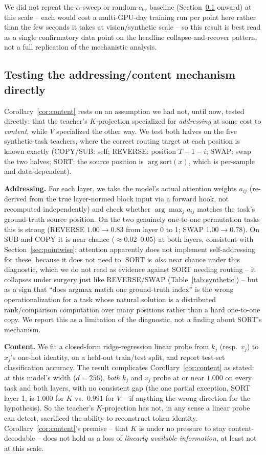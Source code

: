 \documentclass[11pt]{article}
\begin{document}
We did not repeat the $\alpha$-sweep or random-$c_{kv}$ baseline
(Section~\ref{sec:mechanism} onward) at this scale -- each would cost a multi-GPU-day
training run per point here rather than the few seconds it takes at vision/synthetic
scale -- so this result is best read as a
single confirmatory data point on the headline collapse-and-recover pattern, not a
full replication of the mechanistic analysis.

\subsection{Testing the addressing/content mechanism directly}
\label{sec:mechanism}

Corollary~\ref{cor:content} rests on an assumption we had not, until now, tested
directly: that the teacher's $K$-projection specialized for \emph{addressing} at some
cost to \emph{content}, while $V$ specialized the other way. We test both halves on
the five synthetic-task teachers, where the correct routing target at each position
is known exactly (COPY/SUB: self; REVERSE: position $T{-}1{-}i$; SWAP: swap the two
halves; SORT: the source position is $\arg\mathrm{sort}(x)$, which is per-sample and
data-dependent).

\textbf{Addressing.} For each layer, we take the model's actual attention weights
$a_{ij}$ (re-derived from the true layer-normed block input via a forward hook, not
recomputed independently) and check whether $\arg\max_j a_{ij}$ matches the
task's ground-truth source position. On the two genuinely one-to-one permutation
tasks this is strong (REVERSE $1.00 \to 0.83$ from layer 0 to 1; SWAP $1.00 \to
0.78$). On SUB and COPY it is near chance ($\approx 0.02$--$0.05$) at both layers,
consistent with Section~\ref{sec:pointwise}: attention apparently does not implement
self-addressing for these, because it does not need to. SORT is \emph{also} near
chance under this diagnostic, which we do not read as evidence against SORT needing
routing -- it collapses under surgery just like REVERSE/SWAP (Table~\ref{tab:synthetic})
-- but as a sign that ``does argmax match one ground-truth index'' is the wrong
operationalization for a task whose natural solution is a distributed rank/comparison
computation over many positions rather than a hard one-to-one copy. We report this as
a limitation of the diagnostic, not a finding about SORT's mechanism.

\textbf{Content.} We fit a closed-form ridge-regression linear probe from $k_j$
(resp.\ $v_j$) to $x_j$'s one-hot identity, on a held-out train/test split, and report
test-set classification accuracy. The result complicates Corollary~\ref{cor:content}
as stated: at this model's width ($d{=}256$), \emph{both} $k_j$ and $v_j$ probe at or
near $1.000$ on every task and both layers, with no consistent gap (the one partial
exception, SORT layer 1, is $1.000$ for $K$ vs.\ $0.991$ for $V$ -- if anything the
wrong direction for the hypothesis). So the teacher's $K$-projection has not, in any
sense a linear probe can detect, sacrificed the ability to reconstruct token
identity. Corollary~\ref{cor:content}'s premise -- that $K$ is under no pressure to
stay content-decodable -- does not hold as a loss of \emph{linearly available
information}, at least not at this scale.
\end{document}
